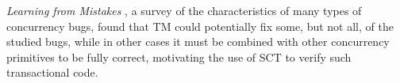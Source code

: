 {\em Learning from Mistakes} \cite{learning-from-mistakes},
a survey of the characteristics of many types of concurrency bugs,
found that TM could potentially fix some, but not all, of the studied bugs,
while in other cases it must be combined with other concurrency primitives to be fully correct,
motivating the use of SCT to verify such transactional code.







